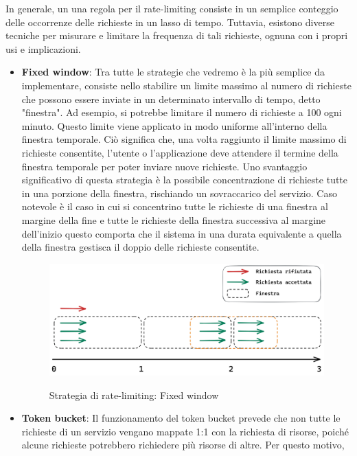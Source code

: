 In generale, un una regola per il rate-limiting consiste in un semplice conteggio delle occorrenze delle richieste in un
lasso di tempo. Tuttavia, esistono diverse tecniche per misurare e limitare la frequenza di tali richieste, ognuna con i
propri usi e implicazioni.
\begin{itemize}
    \item \textbf{Fixed window}: Tra tutte le strategie che vedremo è la più semplice da implementare, consiste nello stabilire un
    limite massimo al numero di richieste che possono essere inviate in un determinato intervallo di tempo, detto
    "finestra". Ad esempio, si potrebbe limitare il numero di richieste a 100 ogni minuto. Questo limite viene applicato in
    modo uniforme all'interno della finestra temporale. Ciò significa che, una volta raggiunto il limite massimo di
    richieste consentite, l'utente o l'applicazione deve attendere il termine della finestra temporale per poter inviare
    nuove richieste. Uno svantaggio significativo di questa strategia è la possibile concentrazione di richieste tutte in
    una porzione della finestra, rischiando un sovraccarico del servizio. Caso notevole è il caso in cui si concentrino tutte
    le richieste di una finestra al margine della fine e tutte le richieste della finestra successiva al margine dell’inizio
    questo comporta che il sistema in una durata equivalente a quella della finestra gestisca il doppio delle richieste
    consentite.
    \begin{figure}[H]
        \centering
        \includegraphics[width=13cm]{./chapters/1.state-of-art/images/1.fixed_window.png}
        \label{fig:fixed-window}
        \captionsetup{justification=centering}
        \caption{Strategia di rate-limiting: Fixed window}
    \end{figure}
    \item \textbf{Token bucket}: Il funzionamento del token bucket prevede che non tutte le richieste di un servizio vengano mappate
    1:1 con la richiesta di risorse, poiché alcune richieste potrebbero richiedere più risorse di altre. Per questo motivo,

\end{itemize}
